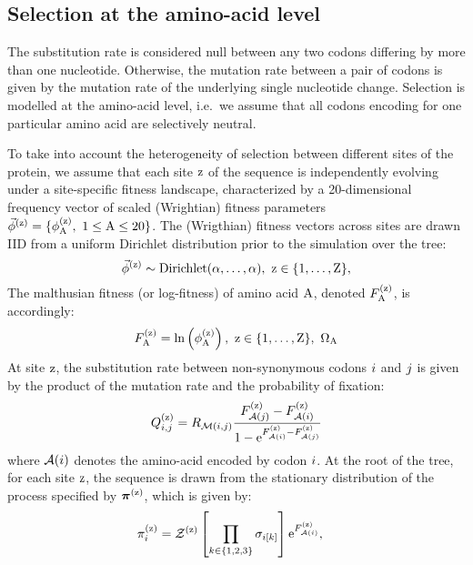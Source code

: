 \subsection{Selection at the amino-acid level}
\label{sec:mut-bias-aa-selection}

The \gls{substitution} rate is considered null between any two \glspl{codon} differing by more than one nucleotide.
Otherwise, the mutation rate between a pair of \glspl{codon} is given by the mutation rate of the underlying single nucleotide change.
Selection is modelled at the amino-acid level, i.e.~we assume that all \glspl{codon} encoding for one particular amino acid are selectively \gls{neutral}.

To take into account the heterogeneity of selection between different sites of the protein, we assume that each site $\text{z}$ of the sequence is independently evolving under a site-specific fitness landscape, characterized by a 20-dimensional frequency vector of scaled (Wrightian) fitness parameters $\vec{\phi}^{(\text{z})} = \{ \phi^{(\text{z})}_{\text{A}},\ 1 \leq \text{A} \leq 20 \}$.
The (Wrigthian) fitness vectors across sites are drawn IID from a uniform Dirichlet distribution \gls{prior} to the simulation over the tree:
\begin{equation}
    \vec{\phi}^{(\text{z})} \sim \text{Dirichlet} (\alpha, \hdots, \alpha),\ \text{z} \in \{1, \hdots, \text{Z}\},
\end{equation}
The malthusian fitness (or log-fitness) of amino acid $\text{A}$, denoted $F^{(\text{z})}_{\text{A}}$, is accordingly:
\begin{equation}
    F^{(\text{z})}_{\text{A}} = \ln \left( \phi^{(\text{z})}_{\text{A}} \right),\ \text{z} \in \{1, \hdots, \text{Z}\}, \ \Omega_{\text{A}}
\end{equation}
At site $\text{z}$, the \gls{substitution} rate between \gls{non-synonymous} \glspl{codon} ${i}$ and ${j}$ is given by the product of the mutation rate and the probability of fixation:
\begin{equation}
    Q_{{i}, {j}}^{(\text{z})} = R_{\mathcal{M}({i}, {j})} \dfrac{F_{\mathcal{A}({j})}^{(\text{z})} - F_{\mathcal{A}({i})}^{(\text{z})}}{1 - \text{e}^{F_{\mathcal{A}({i})}^{(\text{z})} - F_{\mathcal{A}({j})}^{(\text{z})}} } \label{eq:codonsubrates}
\end{equation}
where $\mathcal{A}({i})$ denotes the amino-acid encoded by \gls{codon} ${i}$.
At the root of the tree, for each site $\text{z}$, the sequence is drawn from the stationary distribution of the process specified by $\bm{\pi}^{(\text{z})}$, which is given by:
\begin{align}
    \pi_{{i}}^{(\text{z})} & = \mathcal{Z}^{(\text{z})} \left[\prod\limits_{k \in \{ 1, 2, 3 \}} \sigma_{{i}[k]}\right] \text{e}^{F_{\mathcal{A}({i})}^{(\text{z})}},
    \label{codonStationarity}
\end{align}
